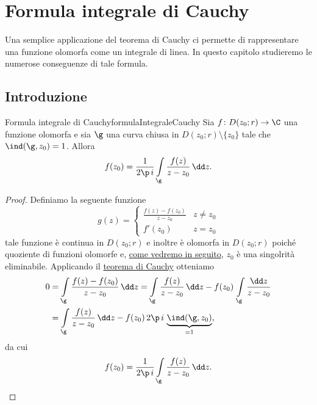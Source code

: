 %
%
\chapter{Formula integrale di Cauchy}

Una semplice applicazione del teorema di Cauchy ci permette di rappresentare una funzione olomorfa come un integrale di linea. In questo capitolo studieremo le numerose conseguenze di tale formula.
\section{Introduzione}
\begin{teor}{Formula integrale di Cauchy}{formulaIntegraleCauchy}
	Sia \(f\colon D(z_0;r) \to \C\) una funzione olomorfa e sia \(\g\) una curva chiusa in \(D(z_0;r)\setminus\{z_0\}\) tale che \(\ind(\g,z_0)=1\). Allora
	\[
		f(z_0) = \frac{1}{2\p\,i} \int\limits_\g \frac{f(z)}{z-z_0}\,\dd z.
	\]
\end{teor}

% 	

\begin{proof}
	Definiamo la seguente funzione
	\[
		g(z) = 	\begin{cases}
			\frac{f(z)-f(z_0)}{z-z_0} & z\neq z_0 \\
			f'(z_0)                   & z=z_0
		\end{cases}
	\]
	tale funzione è continua in \(D(z_0;r)\) e inoltre è olomorfa in \(D(z_0;r)\) poiché quoziente di funzioni olomorfe e, \hyperref[th:teoremaSingolaritàEliminabile]{come vedremo in seguito}, \(z_0\) è una singolrità eliminabile.
	Applicando il \hyperref[th:teorCauchyDischi]{teorema di Cauchy} otteniamo
	\[
		\begin{split}
			0 & = \int\limits_\g \frac{f(z)-f(z_0)}{z-z_0}\,\dd z = \int\limits_\g \frac{f(z)}{z-z_0}\,\dd z - f(z_0)\,\int\limits_\g \frac{\dd z}{z-z_0}\\
			& = \int\limits_\g \frac{f(z)}{z-z_0}\,\dd z - f(z_0)\,2\p\,i\,\underbrace{\ind(\g,z_0)}_{=1},
		\end{split}
	\]
	da cui
	\[
		f(z_0) = \frac{1}{2\p\,i}\int\limits_\g \frac{f(z)}{z-z_0}\,\dd z. \qedhere
	\]
\end{proof}

